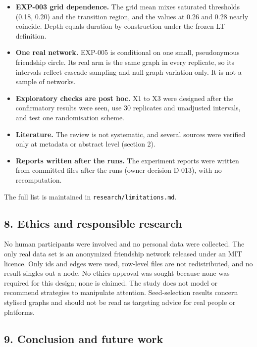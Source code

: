 \documentclass[
]{article}
\begin{document}
\begin{itemize}
  neither confirmed nor refuted.
\item
  \textbf{EXP-003 grid dependence.} The grid mean mixes saturated
  thresholds (0.18, 0.20) and the transition region, and the values at
  0.26 and 0.28 nearly coincide. Depth equals duration by construction
  under the frozen LT definition.
\item
  \textbf{One real network.} EXP-005 is conditional on one small,
  pseudonymous friendship circle. Its real arm is the same graph in
  every replicate, so its intervals reflect cascade sampling and
  null-graph variation only. It is not a sample of networks.
\item
  \textbf{Exploratory checks are post hoc.} X1 to X3 were designed after
  the confirmatory results were seen, use 30 replicates and unadjusted
  intervals, and test one randomisation scheme.
\item
  \textbf{Literature.} The review is not systematic, and several sources
  were verified only at metadata or abstract level (section 2).
\item
  \textbf{Reports written after the runs.} The experiment reports were
  written from committed files after the runs (owner decision D-013),
  with no recomputation.
\end{itemize}

The full list is maintained in \texttt{research/limitations.md}.

\subsection{8. Ethics and responsible
research}\label{ethics-and-responsible-research}

No human participants were involved and no personal data were collected.
The only real data set is an anonymized friendship network released
under an MIT licence. Only ids and edges were used, row-level files are
not redistributed, and no result singles out a node. No ethics approval
was sought because none was required for this design; none is claimed.
The study does not model or recommend strategies to manipulate
attention. Seed-selection results concern stylised graphs and should not
be read as targeting advice for real people or platforms.

\subsection{9. Conclusion and future
work}\label{conclusion-and-future-work}
\end{document}
